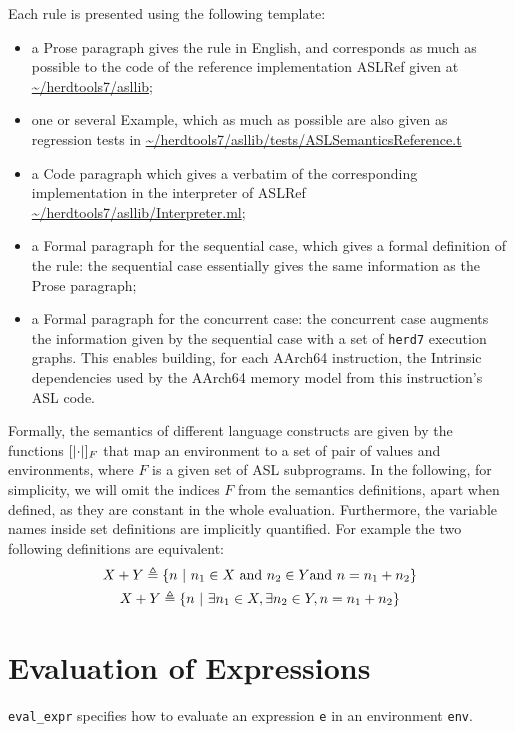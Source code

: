 \documentclass{book}
\begin{document}
Each rule is presented using the following template:
\begin{itemize}
\item a Prose paragraph gives the rule in English, and corresponds as much as possible to the code of the reference implementation ASLRef given at \url{~/herdtools7/asllib};
\item one or several Example, which as much as possible are also given as regression tests in \url{~/herdtools7/asllib/tests/ASLSemanticsReference.t} 
\item a Code paragraph which gives a verbatim of the corresponding implementation in the interpreter of ASLRef \url{~/herdtools7/asllib/Interpreter.ml};
\item a Formal paragraph for the sequential case, which gives a formal
definition of the rule: the sequential case essentially gives the same
information as the Prose paragraph;
\item a Formal paragraph for the concurrent case: the concurrent case augments
the information given by the sequential case with a set of \texttt{herd7}
execution graphs. This enables building, for each AArch64 instruction, the
Intrinsic dependencies used by the AArch64 memory model from this instruction's
ASL code.
\end{itemize}
%
Formally, the semantics of different language constructs are given by the functions
$\left[| \cdot \right|]_F$ that map an environment to a set of pair of values and
environments, where $F$ is a given set of ASL subprograms.
%
In the following, for simplicity, we will omit the indices $F$ from the
semantics definitions, apart when defined, as they are constant in the whole
evaluation.
%
Furthermore, the variable names inside set definitions are implicitly
quantified. For example the two following definitions are equivalent:
%
\begin{gather*}
  X + Y \triangleq \left\{ n \ \middle|\ {} n_1 \in X \ \text{and}\ n_2 \in Y \text{and}\ n = n_1 + n_2 \right\}
  \\
  X + Y \triangleq \left\{ n \ \middle|\ {} \exists n_1 \in X, \exists n_2 \in Y, n = n_1 + n_2 \right\}
\end{gather*}


\chapter{Evaluation of Expressions \label{chap:eval_expr}}

\texttt{eval\_expr} specifies how to evaluate an expression \texttt{e} in an
environment \texttt{env}. 
\end{document}
